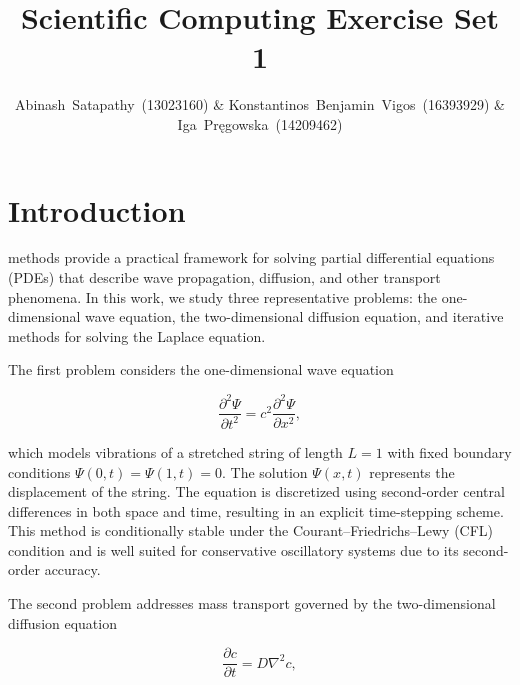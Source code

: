 \documentclass[10pt, journal]{IEEEtran}
\begin{document}
\title{Scientific Computing Exercise Set 1}

\author{Abinash~Satapathy~(13023160) \& Konstantinos~Benjamin~Vigos~(16393929) \& Iga~Pręgowska~(14209462)}




\maketitle

\section{Introduction} \label{intro}

 methods provide a practical framework for solving partial differential equations (PDEs) that describe wave propagation, diffusion, and other transport phenomena. In this work, we study three representative problems: the one-dimensional wave equation, the two-dimensional diffusion equation, and iterative methods for solving the Laplace equation.

The first problem considers the one-dimensional wave equation

\begin{equation}
\frac{\partial^2 \Psi}{\partial t^2}
=
c^2 \frac{\partial^2 \Psi}{\partial x^2},
\end{equation}

which models vibrations of a stretched string of length $L=1$ with fixed boundary conditions $\Psi(0,t)=\Psi(1,t)=0$. The solution $\Psi(x,t)$ represents the displacement of the string. The equation is discretized using second-order central differences in both space and time, resulting in an explicit time-stepping scheme. This method is conditionally stable under the Courant–Friedrichs–Lewy (CFL) condition and is well suited for conservative oscillatory systems due to its second-order accuracy.

The second problem addresses mass transport governed by the two-dimensional diffusion equation

\begin{equation}
\frac{\partial c}{\partial t}
=
D \nabla^2 c,
\label{eq:finite_difference}
\end{equation}
\end{document}
